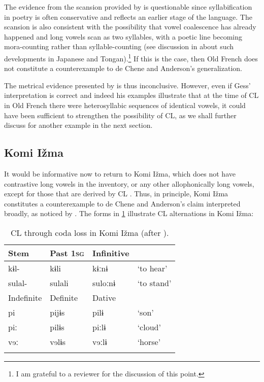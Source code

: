\documentclass[output=paper,
modfonts
]{LSP/langsci}
\begin{document}
The evidence from the scansion provided by \citet{gess1998} is questionable
since syllabification in poetry is often conservative and reflects an
earlier stage of the language. The scansion is also consistent with the
possibility that vowel coalescence has already happened and long vowels
scan as two syllables, with a poetic line becoming mora-counting rather
than syllable-counting (see discussion in \citet[76, 84ff]{deChene1985}
about such developments in Japanese and Tongan).\footnote{I am grateful
  to a reviewer for the discussion of this point.} If this is the case,
then Old French does not constitute a counterexample to de Chene and
Anderson's generalization.

The metrical evidence presented by \citet{gess1998} is thus inconclusive.
However, even if Gess' interpretation is correct and indeed his examples
illustrate that at the time of CL in Old French there were
heterosyllabic sequences of identical vowels, it could have been
sufficient to strengthen the possibility of CL, as we shall further
discuss for another example in the next section.

\subsection{Komi Ižma}

It would be informative now to return to Komi Ižma, which does not have
contrastive long vowels in the inventory, or any other allophonically
long vowels, except for those that are derived by CL \citep{lytkin1966,lytkin1976,hausenberg1998}. Thus, in principle, Komi
Ižma constitutes a counterexample to de Chene and Anderson's claim
interpreted broadly, as noticed by \citet{gess1998}. The forms in \cref{tab:clcodaloski}
illustrate CL alternations in Komi Ižma:

\begin{table}
\begin{tabular}{llll}
\lsptoprule
Stem	&	Past 1\textsc{sg}	&	Infinitive		&	\\
\midrule
kɨl- 		&	kɨli 			&	kɨːnɨ 			&	`to hear' \\
sulal- 		&	sulali 			&	suloːnɨ 			&	`to stand'\\
\midrule
Indefinite & 	Definite		&	Dative		&	\\
\midrule
pi 			&	pijɨs 			&	pilɨ 			&	`son'\\
piː 			&	pilɨs 			&	piːlɨ 			&	`cloud'\\
vɘː 			&	vɘlɨs 			&	vɘːlɨ 			&	`horse'\\
\lspbottomrule
\end{tabular}
\caption{CL through coda loss in Komi Ižma (after \citealt[104--105]{harms1968}).}
\label{tab:clcodaloski}
\end{table}
\end{document}
